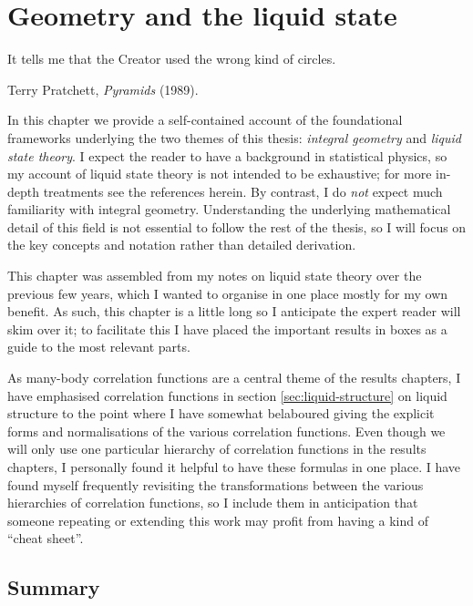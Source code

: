 \documentclass[11pt,twoside]{report}
\begin{document}
\chapter{Geometry and the liquid state}
\epigraph{It tells me that the Creator used the wrong kind of circles.}{Terry Pratchett, \emph{Pyramids} (1989).}
\label{chapter:background}

In this chapter we provide a self-contained account of the foundational frameworks underlying the two themes of this thesis: \emph{integral geometry} and \emph{liquid state theory}.
I expect the reader to have a background in statistical physics, so my account of liquid state theory is not intended to be exhaustive; for more in-depth treatments see the references herein.
By contrast, I do \emph{not} expect much familiarity with integral geometry.
Understanding the underlying mathematical detail of this field is not essential to follow the rest of the thesis, so I will focus on the key concepts and notation rather than detailed derivation.

This chapter was assembled from my notes on liquid state theory over the previous few years, which I wanted to organise in one place mostly for my own benefit.
As such, this chapter is a little long so I anticipate the expert reader will skim over it; to facilitate this I have placed the important results in boxes as a guide to the most relevant parts.

As many-body correlation functions are a central theme of the results chapters, I have emphasised correlation functions in section \ref{sec:liquid-structure} on liquid structure to the point where I have somewhat belaboured giving the explicit forms and normalisations of the various correlation functions.
Even though we will only use one particular hierarchy of correlation functions in the results chapters, I personally found it helpful to have these formulas in one place.
I have found myself frequently revisiting the transformations between the various hierarchies of correlation functions, so I include them in anticipation that someone repeating or extending this work may profit from having a kind of ``cheat sheet''.





\section{Summary}
\end{document}
